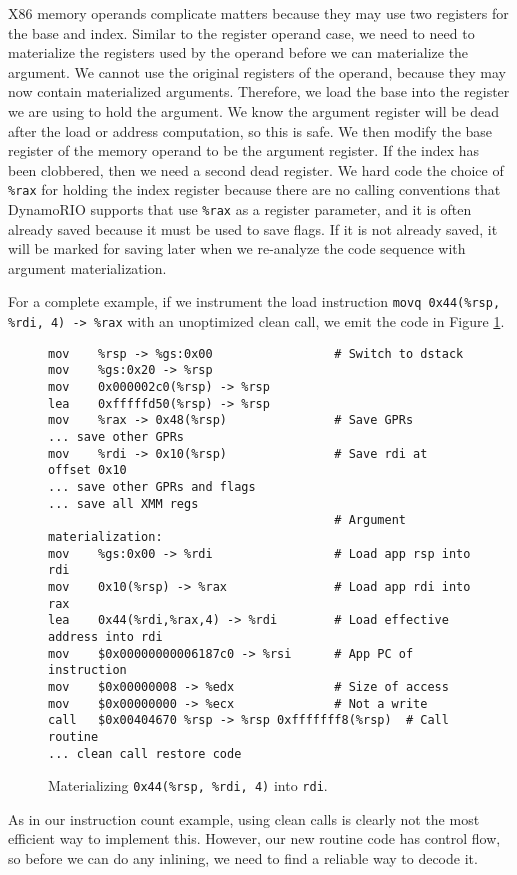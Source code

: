 X86 memory operands complicate matters because they may use two registers for
the base and index.  Similar to the register operand case, we need to need to
materialize the registers used by the operand before we can materialize the
argument.  We cannot use the original registers of the operand, because they may
now contain materialized arguments.  Therefore, we load the base into the
register we are using to hold the argument.  We know the argument register will
be dead after the load or address computation, so this is safe.  We then modify
the base register of the memory operand to be the argument register.  If the
index has been clobbered, then we need a second dead register.  We hard code the
choice of {\tt \%rax} for holding the index register because there are no
calling conventions that DynamoRIO supports that use {\tt \%rax} as a register
parameter, and it is often already saved because it must be used to save flags.
If it is not already saved, it will be marked for saving later when we
re-analyze the code sequence with argument materialization.

For a complete example, if we instrument the load instruction {\tt movq
0x44(\%rsp, \%rdi, 4) -> \%rax} with an unoptimized clean call, we emit the code
in Figure \ref{fig:arg_mat_lea}.

\begin{figure}
\begin{verbatim}
mov    %rsp -> %gs:0x00                 # Switch to dstack
mov    %gs:0x20 -> %rsp 
mov    0x000002c0(%rsp) -> %rsp 
lea    0xfffffd50(%rsp) -> %rsp 
mov    %rax -> 0x48(%rsp)               # Save GPRs
... save other GPRs
mov    %rdi -> 0x10(%rsp)               # Save rdi at offset 0x10
... save other GPRs and flags
... save all XMM regs
                                        # Argument materialization:
mov    %gs:0x00 -> %rdi                 # Load app rsp into rdi
mov    0x10(%rsp) -> %rax               # Load app rdi into rax
lea    0x44(%rdi,%rax,4) -> %rdi        # Load effective address into rdi
mov    $0x00000000006187c0 -> %rsi      # App PC of instruction
mov    $0x00000008 -> %edx              # Size of access
mov    $0x00000000 -> %ecx              # Not a write
call   $0x00404670 %rsp -> %rsp 0xfffffff8(%rsp)  # Call routine
... clean call restore code
\end{verbatim}
\caption{Materializing {\tt 0x44(\%rsp, \%rdi, 4)} into {\tt rdi}.}
\label{fig:arg_mat_lea}
\end{figure}

As in our instruction count example, using clean calls is clearly not the most
efficient way to implement this.  However, our new routine code has control
flow, so before we can do any inlining, we need to find a reliable way to decode
it.


